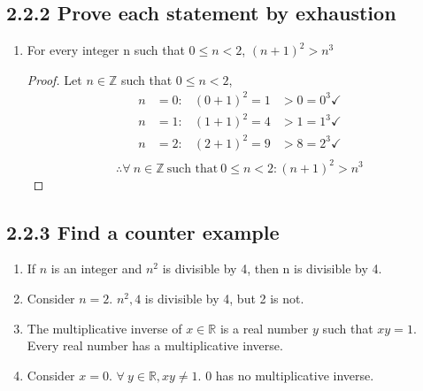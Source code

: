 





\subsection*{2.2.2 Prove each statement by exhaustion}
\begin{enumerate}
  \item[\bld{a.}] For every integer n such that $0 \leq n < 2$, $(n+1)^2 > n^3$
    \begin{proof}
      Let $n \in \mathbb{Z}$ such that $0 \leq n < 2$,
      \begin{align*}
        n & = 0: & (0+1)^2 = 1 & > 0 = 0^3 \checkmark \\
        n & = 1: & (1+1)^2 = 4 & > 1 = 1^3 \checkmark \\
        n & = 2: & (2+1)^2 = 9 & > 8 = 2^3 \checkmark \\
      \end{align*}
      \[
        \therefore \forall~ n \in \mathbb{Z}~\text{such that}~0 \leq n < 2: (n+1)^2 > n^3
      \]
    \end{proof}
\end{enumerate}

\subsection*{2.2.3 Find a counter example}
\begin{enumerate}
  \item[\bld{b.}] If $n$ is an integer and $n^2$ is divisible by 4, then n is divisible by 4.
  \item[]  Consider $n=2$. $n^2,4$ is divisible by 4, but 2 is not.
  \item[\bld{e.}] The multiplicative inverse of $x \in \mathbb{R}$ is a real number $y$ such that
    $xy = 1$. Every real number has a multiplicative inverse.
  \item[]  Consider $x=0$. $\forall~ y \in \mathbb{R}, xy \not = 1$. 0 has no multiplicative inverse.
\end{enumerate}

